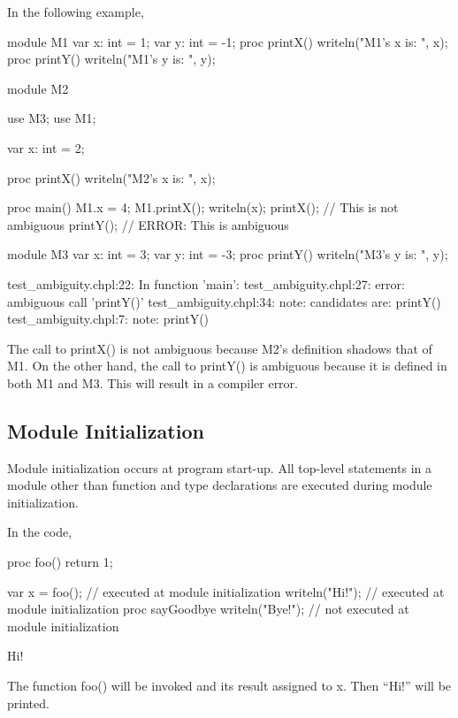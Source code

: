 \begin{example}
In the following example,
\begin{chapelpre}
\end{chapelpre}
\begin{chapel}
module M1 {
  var x: int = 1;
  var y: int = -1;
  proc printX() {
    writeln("M1's x is: ", x);
  }
  proc printY() {
    writeln("M1's y is: ", y);
  }
}
 
module M2 {
  use M3;
  use M1;

  var x: int = 2;

  proc printX() {
    writeln("M2's x is: ", x);
  }

  proc main() {
    M1.x = 4;
    M1.printX();
    writeln(x);
    printX(); // This is not ambiguous
    printY(); // ERROR: This is ambiguous
  }
}

module M3 {
  var x: int = 3;
  var y: int = -3;
  proc printY() {
    writeln("M3's y is: ", y);
  }
}
\end{chapel}
\begin{chapeloutput}
test\_ambiguity.chpl:22: In function 'main':
test\_ambiguity.chpl:27: error: ambiguous call 'printY()'
test\_ambiguity.chpl:34: note: candidates are: printY()
test\_ambiguity.chpl:7: note:                 printY()
\end{chapeloutput}
The call to printX() is not ambiguous because M2's definition shadows
that of M1.  On the other hand, the call to printY() is ambiguous
because it is defined in both M1 and M3.  This will result in a
compiler error.
\end{example}


\subsection{Module Initialization}
\label{Module_Initialization}

Module initialization occurs at program start-up.  All top-level
statements in a module other than function and type declarations are
executed during module initialization.

\begin{example}
In the code,
\begin{chapelpre}
proc foo() {
    return 1;
}
\end{chapelpre}
\begin{chapel}
var x = foo();       // executed at module initialization
writeln("Hi!");      // executed at module initialization
proc sayGoodbye {
  writeln("Bye!");   // not executed at module initialization
}
\end{chapel}
\begin{chapeloutput}
Hi!
\end{chapeloutput}
The function foo() will be invoked and its result assigned to x.  Then
``Hi!'' will be printed.
\end{example}

